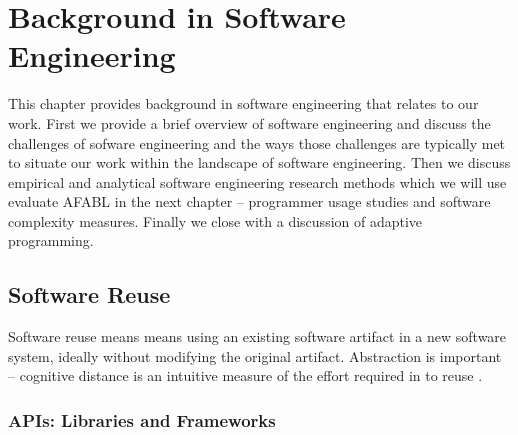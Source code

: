 \chapter{Background in Software Engineering}\label{ch:se}

This chapter provides background in software engineering that relates to our work. First we provide a brief overview of software engineering and discuss the challenges of sofware engineering and the ways those challenges are typically met to situate our work within the landscape of software engineering. Then we discuss empirical and analytical software engineering research methods which we will use evaluate AFABL in the next chapter -- programmer usage studies and software complexity measures. Finally we close with a discussion of adaptive programming.




\cite{gacek1995a-exploiting}


\cite{runeson2009a-guidelines}


\cite{shull2000a-investigating}


\cite{dmitriev2004a-language}





\section{Software Reuse}

Software reuse means means using an existing software artifact in a new software system, ideally without modifying the original artifact. Abstraction is important -- cognitive distance is an intuitive measure of the effort required in to reuse \cite{krueger1992a-software}.

\cite{gacek1995a-exploiting}


\cite{mili1995a-reusing}


\cite{frakes1996a-software}

\cite{frakes2005a-software}



\cite{basili1996a-how-reuse}





\cite{shiva2007a-software}


\cite{mohagheghi2008a-an-empirical}


\cite{lorenz2011a-code}


\subsection{APIs: Libraries and Frameworks}




